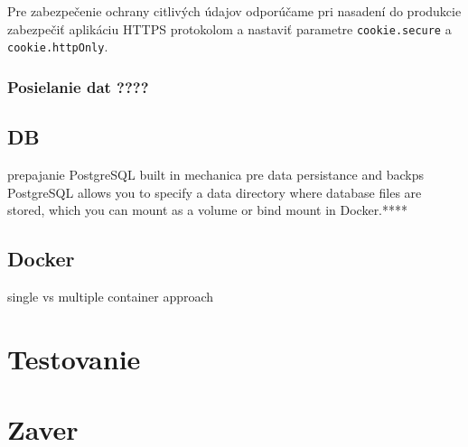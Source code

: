 Pre zabezpečenie ochrany citlivých údajov odporúčame pri nasadení do produkcie zabezpečiť aplikáciu HTTPS protokolom a nastaviť parametre \texttt{cookie.secure} a \texttt{cookie.httpOnly}.


 \subsubsection{Posielanie dat ????}

 
 \subsection{DB}
 prepajanie
  PostgreSQL
  built in mechanica pre data persistance and backps PostgreSQL allows you to specify a data directory where database files are stored, which you can mount as a volume or bind mount in Docker.****

  \subsection{Docker}
  single vs multiple container approach

  \section{Testovanie}
  \section{Zaver}